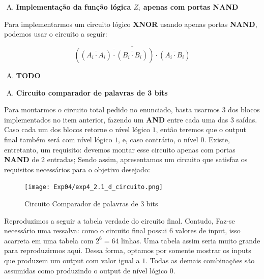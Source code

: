 \documentclass[12pt]{article}
\begin{document}
\begin{enumerate}[B)]
\item \textbf{Implementação da função lógica $Z_{i}$ apenas com portas NAND}
\end{enumerate}

Para implementarmos um circuito lógico \textbf{XNOR} usando apenas portas
\textbf{NAND}, podemos usar o circuito a seguir:

\begin{equation}
\overline{\left( \overline{(\overline{A_{i} \cdot A_{i}}) \cdot (\overline{B_{i} \cdot B_{i}})} \right) \cdot (\overline{A_{i} \cdot B_{i}})}
\end{equation}

\begin{enumerate}[C)]
\item \textbf{TODO}
\end{enumerate}

\begin{enumerate}[D)]
\item \textbf{Circuito comparador de palavras de 3 bits}
\end{enumerate}

Para montarmos o circuito total pedido no enunciado, basta usarmos $3$ dos
blocos implementados no item anterior, fazendo um \textbf{AND} entre cada uma
das $3$ saídas. Caso cada um dos blocos retorne o nível lógico $1$, então
teremos que o output final também será com nível lógico $1$, e, caso contrário,
o nível $0$. Existe, entretanto, um requisito: devemos montar esse circuito
apenas com portas \textbf{NAND} de $2$ entradas; Sendo assim, apresentamos um
circuito que satisfaz os requisitos necessários para o objetivo desejado:

\begin{figure}[H]
    \centering
    \texttt{[image: Exp04/exp4\_2.1\_d\_circuito.png]}
    \caption{Circuito Comparador de palavras de 3 bits}\label{fig:exp4_2.1_d_circuito.png}
\end{figure}

Reproduzimos a seguir a tabela verdade do circuito final. Contudo, Faz-se
necessário uma ressalva: como o circuito final possui $6$ valores de input, isso
acarreta em uma tabela com $2^{6} = 64$ linhas. Uma tabela assim seria muito
grande para reproduzirmos aqui. Dessa forma, optamos por somente mostrar os
inputs que produzem um output com valor igual a $1$. Todas as demais combinações
são assumidas como produzindo o output de nível lógico $0$.
\end{document}
